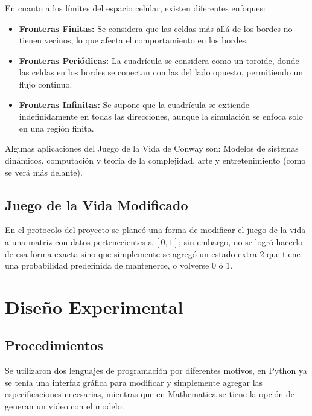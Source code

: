 \documentclass[conference]{IEEEtran}
\begin{document}
En cuanto a los límites del espacio celular, existen diferentes enfoques:

\begin{itemize}
	\item \textbf{Fronteras Finitas: }Se considera que las celdas más allá de los bordes no tienen vecinos, lo que afecta el comportamiento en los bordes.
	\item \textbf{Fronteras Periódicas:} La cuadrícula se considera como un toroide, donde las celdas en los bordes se conectan con las del lado opuesto, permitiendo un flujo continuo.
	\item \textbf{Fronteras Infinitas:} Se supone que la cuadrícula se extiende indefinidamente en todas las direcciones, aunque la simulación se enfoca solo en una región finita.
\end{itemize}

Algunas aplicaciones del Juego de la Vida de Conway son: Modelos de sistemas dinámicos, computación y teoría de la complejidad, arte y entretenimiento (como se verá más delante).
    
\subsection{Juego de la Vida Modificado}
En el protocolo del proyecto se planeó una forma de modificar el juego de la vida a una matriz con datos pertenecientes a $[0,1]$; sin embargo, no se logró hacerlo de esa forma exacta sino que simplemente se agregó un estado extra $2$ que tiene una probabilidad predefinida de mantenerce, o volverse $0$ ó $1$. 
    
\section{Diseño Experimental}

    \subsection{Procedimientos}
    
		Se utilizaron dos lenguajes de programación por diferentes motivos, en Python ya se tenía una interfaz gráfica para modificar y simplemente agregar las especificaciones necesarias, mientras que en Mathematica se tiene la opción de generan un video con el modelo.    	
    	
\end{document}

